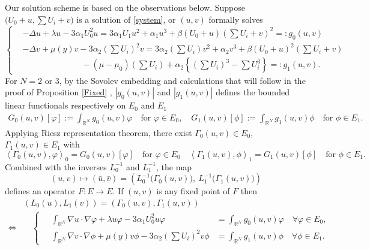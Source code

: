 \documentclass[a4paper,11pt]{article}
\numberwithin{step}{dummy}
\begin{document}
Our solution scheme is based on the observations below. Suppose $\big(U_0 +u, \sum U_i + v\big)$ is a solution of \eqref{system}, or $(u,v)$ formally solves
\begin{equation*}
 \left\{
 \begin{aligned}
 &-\Delta u + \lambda u - 3\alpha_1U_0^2 u = 3\alpha_1U_1 u^2 + \alpha_1u^3 + \beta(U_0+u)\left(\sum U_i +v\right)^2=:g_0(u,v)\\
 &-\Delta v + \mu(y) v - 3\alpha_2\left(\sum U_i\right)^2 v = 3\alpha_2\left(\sum U_i\right)v^2 + \alpha_2v^3 + \beta\left(U_0 +u\right)^2\left(\sum U_i +v\right)  \\
 & \quad \quad \quad \quad \quad \quad \quad - (\mu-\mu_0)\left(\sum U_i\right)+ \alpha_2\left\{ \left(\sum U_i\right)^3 - \sum U_i^3 \right\} =:g_1(u,v).
 \end{aligned}
 \right.
\end{equation*}
For $N=2$ or $3$, by the Sovolev embedding and calculations that will follow in the proof of Proposition \ref{Fixed} , $|g_0(u,v)|$ and $|g_1(u,v)|$ {defines the bounded linear functionals respectively on $E_0$ and $E_1$} 
\begin{align*}
 G_0(u,v)[\varphi]:=\int_{ \mathbb{R}^N} g_0(u,v)\varphi \quad \text{for $\varphi \in E_0$}, \quad
 G_1(u,v)[\phi]:=\int_{ \mathbb{R}^N} g_1(u,v)\phi \quad \text{for $\phi \in E_1$}.
\end{align*}
Applying Riesz representation theorem, there exist $\Gamma_0(u,v) \in E_0$, $\Gamma_1(u,v) \in E_1$ with
$$\left<\Gamma_0(u,v),\varphi\right>_0 = G_0(u,v)[\varphi] \quad \text{for $\varphi \in E_0$} \quad \left<\Gamma_1(u,v),\phi\right>_1 = G_1(u,v)[\phi] \quad \text{for $\phi \in E_1$}.$$
Combined with the inverses $L_0^{-1}$ and $L_1^{-1}$, the map
$$(u,v) \mapsto (\bar{u},\bar{v})=\left(L_0^{-1}\Big(\Gamma_0(u,v)\Big), ~L_1^{-1}\Big(\Gamma_1(u,v)\Big)\right)$$
defines an operator $F: E \rightarrow E$. If $(u,v)$ is any fixed point of $F$ then
\begin{align*}
 &\left(L_0(u),L_1(v)\right) = \left(\Gamma_0(u,v),\Gamma_1(u,v)\right)\\
 \Longleftrightarrow &
 \quad\left\{ \quad
 \begin{aligned}
  \int_{\mathbb{R}^N} \nabla u \cdot \nabla \varphi + \lambda u\varphi - 3\alpha_1U_0^2 u\varphi &= \int_{\mathbb{R}^N} g_0(u,v)\varphi \quad \forall \varphi\in E_0,\\
  \int_{\mathbb{R}^N} \nabla v \cdot \nabla \phi + \mu(y) v\phi - 3\alpha_2\left(\sum U_i\right)^2v\phi &= \int_{\mathbb{R}^N} g_1(u,v)\phi \quad \forall \phi \in E_1.
 \end{aligned}
 \right.
\end{align*}
\end{document}
